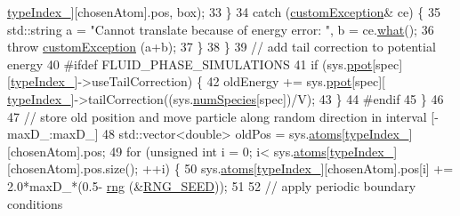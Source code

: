 \begin{DoxyCode}
      \hyperlink{classmc_move_acb731965547b0326ef318ec96da8b46a}{typeIndex\_}][chosenAtom].pos, box);
33                                                 \}
34                                                 \textcolor{keywordflow}{catch} (\hyperlink{classcustom_exception}{customException}& ce) \{
35                                                                 std::string a = \textcolor{stringliteral}{"Cannot translate because
       of energy error: "}, b = ce.\hyperlink{classcustom_exception_aeb6ab5848b038adfc68fde86a512f691}{what}();
36                                                                 \textcolor{keywordflow}{throw} 
      \hyperlink{classcustom_exception}{customException} (a+b);
37                                                 \}
38         \}
39         \textcolor{comment}{// add tail correction to potential energy}
40 \textcolor{preprocessor}{#ifdef FLUID\_PHASE\_SIMULATIONS}
41         \textcolor{keywordflow}{if} (sys.\hyperlink{classsim_system_a8d6271751a62f61edcf57f773540a4a3}{ppot}[spec][\hyperlink{classmc_move_acb731965547b0326ef318ec96da8b46a}{typeIndex\_}]->useTailCorrection) \{
42                                                 oldEnergy += sys.\hyperlink{classsim_system_a8d6271751a62f61edcf57f773540a4a3}{ppot}[spec][
      \hyperlink{classmc_move_acb731965547b0326ef318ec96da8b46a}{typeIndex\_}]->tailCorrection((sys.\hyperlink{classsim_system_a9eea865e6dc1cff377b1e79c4d9c23f0}{numSpecies}[spec])/V);
43                                 \}
44 \textcolor{preprocessor}{#endif}
45     \}
46     
47     \textcolor{comment}{// store old position and move particle along random direction in interval [-maxD\_:maxD\_]}
48     std::vector<double> oldPos = sys.\hyperlink{classsim_system_a90421b19082f7fb8fc23b7264b1161e4}{atoms}[\hyperlink{classmc_move_acb731965547b0326ef318ec96da8b46a}{typeIndex\_}][chosenAtom].pos;
49     \textcolor{keywordflow}{for} (\textcolor{keywordtype}{unsigned} \textcolor{keywordtype}{int} i = 0; i< sys.\hyperlink{classsim_system_a90421b19082f7fb8fc23b7264b1161e4}{atoms}[\hyperlink{classmc_move_acb731965547b0326ef318ec96da8b46a}{typeIndex\_}][chosenAtom].pos.size(); ++i) \{
50                 sys.\hyperlink{classsim_system_a90421b19082f7fb8fc23b7264b1161e4}{atoms}[\hyperlink{classmc_move_acb731965547b0326ef318ec96da8b46a}{typeIndex\_}][chosenAtom].pos[i] += 2.0*maxD\_*(0.5-
      \hyperlink{utilities_8cpp_a0f9542af4b475ac79cb679d7a8d14db0}{rng} (&\hyperlink{global_8h_a3f4e4ea24d5a5c66feae55d1f329c884}{RNG\_SEED}));
51                 
52                 \textcolor{comment}{// apply periodic boundary conditions}

\end{DoxyCode}
